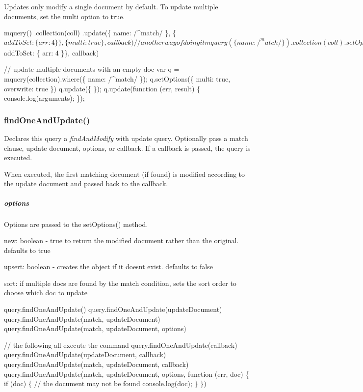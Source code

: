 Updates only modify a single document by default. To update multiple documents, set the {\ttfamily multi} option to {\ttfamily true}.


\begin{DoxyCode}
mquery()
  .collection(coll)
  .update(\{ name: /^match/ \}, \{ $addToSet: \{ arr: 4 \}\}, \{ multi: true \}, callback)

// another way of doing it
mquery(\{ name: /^match/ \})
  .collection(coll)
  .setOptions(\{ multi: true \})
  .update(\{ $addToSet: \{ arr: 4 \}\}, callback)

// update multiple documents with an empty doc
var q = mquery(collection).where(\{ name: /^match/ \});
q.setOptions(\{ multi: true, overwrite: true \})
q.update(\{ \});
q.update(function (err, result) \{
  console.log(arguments);
\});
\end{DoxyCode}


\subsubsection*{find\+One\+And\+Update()}

Declares this query a {\itshape find\+And\+Modify} with update query. Optionally pass a match clause, update document, options, or callback. If a callback is passed, the query is executed.

When executed, the first matching document (if found) is modified according to the update document and passed back to the callback.

\subparagraph*{options}

Options are passed to the {\ttfamily set\+Options()} method.


\begin{DoxyItemize}
\item {\ttfamily new}\+: boolean -\/ true to return the modified document rather than the original. defaults to true
\item {\ttfamily upsert}\+: boolean -\/ creates the object if it doesn\textquotesingle{}t exist. defaults to false
\item {\ttfamily sort}\+: if multiple docs are found by the match condition, sets the sort order to choose which doc to update
\end{DoxyItemize}


\begin{DoxyCode}
query.findOneAndUpdate()
query.findOneAndUpdate(updateDocument)
query.findOneAndUpdate(match, updateDocument)
query.findOneAndUpdate(match, updateDocument, options)

// the following all execute the command
query.findOneAndUpdate(callback)
query.findOneAndUpdate(updateDocument, callback)
query.findOneAndUpdate(match, updateDocument, callback)
query.findOneAndUpdate(match, updateDocument, options, function (err, doc) \{
  if (doc) \{
    // the document may not be found
    console.log(doc);
  \}
\})
\end{DoxyCode}



